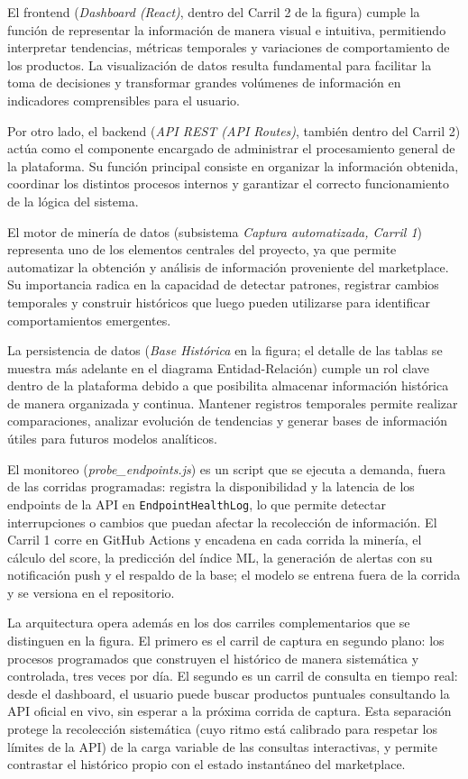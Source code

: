 El frontend (\emph{Dashboard (React)}, dentro del Carril 2 de la figura) cumple la función de representar la información de manera visual e intuitiva, permitiendo interpretar tendencias, métricas temporales y variaciones de comportamiento de los productos. La visualización de datos resulta fundamental para facilitar la toma de decisiones y transformar grandes volúmenes de información en indicadores comprensibles para el usuario.

Por otro lado, el backend (\emph{API REST (API Routes)}, también dentro del Carril 2) actúa como el componente encargado de administrar el procesamiento general de la plataforma. Su función principal consiste en organizar la información obtenida, coordinar los distintos procesos internos y garantizar el correcto funcionamiento de la lógica del sistema.

El motor de minería de datos (subsistema \emph{Captura automatizada, Carril 1}) representa uno de los elementos centrales del proyecto, ya que permite automatizar la obtención y análisis de información proveniente del marketplace. Su importancia radica en la capacidad de detectar patrones, registrar cambios temporales y construir históricos que luego pueden utilizarse para identificar comportamientos emergentes.

La persistencia de datos (\emph{Base Histórica} en la figura; el detalle de las tablas se muestra más adelante en el diagrama Entidad-Relación) cumple un rol clave dentro de la plataforma debido a que posibilita almacenar información histórica de manera organizada y continua. Mantener registros temporales permite realizar comparaciones, analizar evolución de tendencias y generar bases de información útiles para futuros modelos analíticos.

El monitoreo (\emph{probe\_endpoints.js}) es un script que se ejecuta a demanda, fuera de las corridas programadas: registra la disponibilidad y la latencia de los endpoints de la API en \texttt{EndpointHealthLog}, lo que permite detectar interrupciones o cambios que puedan afectar la recolección de información. El Carril 1 corre en GitHub Actions y encadena en cada corrida la minería, el cálculo del score, la predicción del índice ML, la generación de alertas con su notificación push y el respaldo de la base; el modelo se entrena fuera de la corrida y se versiona en el repositorio.

La arquitectura opera además en los dos carriles complementarios que se distinguen en la figura. El primero es el carril de captura en segundo plano: los procesos programados que construyen el histórico de manera sistemática y controlada, tres veces por día. El segundo es un carril de consulta en tiempo real: desde el dashboard, el usuario puede buscar productos puntuales consultando la API oficial en vivo, sin esperar a la próxima corrida de captura. Esta separación protege la recolección sistemática (cuyo ritmo está calibrado para respetar los límites de la API) de la carga variable de las consultas interactivas, y permite contrastar el histórico propio con el estado instantáneo del marketplace.

